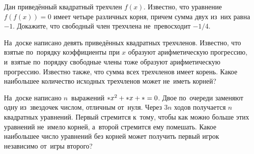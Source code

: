 \begin{problems}
\item
Дан приведённый квадратный трехчлен $f(x)$.
Известно, что уравнение $f(f(x)) = 0$ имеет четыре различных корня, причем
сумма двух из~них равна $-1$.
Докажите, что свободный член трехчлена не~превосходит $-1/4$.

\item
На~доске написано девять приведённых квадратных трехчленов.
Известно, что взятые по~порядку коэффициенты при $x$ образуют арифметическую
прогрессию, и~взятые по~порядку свободные члены тоже образуют арифметическую
прогрессию.
Известно также, что сумма всех трехчленов имеет корень.
Какое наибольшее количество исходных трехчленов может не~иметь корней?

\item
На~доске написано $n$~выражений
\( \def\star{\mathord{\ast}}%
    \star x^2 + \star x + \star = 0
\).
Двое по~очереди заменяют одну из~звездочек числом, отличным от~нуля.
Через $3n$ ходов получается $n$ квадратных уравнений.
Первый стремится к~тому, чтобы как можно больше этих уравнений не~имело корней,
а~второй стремится ему помешать.
Какое наибольшее число уравнений без корней может получить первый игрок
независимо от~игры второго?

\end{problems}


